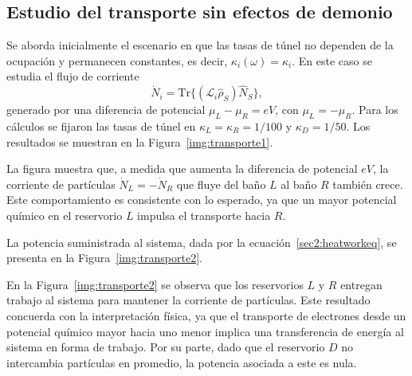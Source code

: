\subsection{Estudio del transporte sin efectos de demonio}

Se aborda inicialmente el escenario en que las tasas de túnel no dependen de la ocupación y permanecen constantes, es decir, $\kappa_{i}(\omega) = \kappa_{i}$. En este caso se estudia el flujo de corriente
\[
\dot{N}_{i} = \mathrm{Tr}\{(\mathcal{L}_{i}\hat{\rho}_{S})\hat{N}_{S}\},
\]
generado por una diferencia de potencial $\mu_{L} - \mu_{R} = eV$, con $\mu_{L}=-\mu_{R}$. Para los cálculos se fijaron las tasas de túnel en $\kappa_{L} = \kappa_{R} = 1/100$ y $\kappa_{D} = 1/50$. Los resultados se muestran en la Figura~\ref{img:transporte1}.  


La figura muestra que, a medida que aumenta la diferencia de potencial $eV$, la corriente de partículas $\dot{N}_L = -\dot{N}_R$ que fluye del baño $L$ al baño $R$ también crece. Este comportamiento es consistente con lo esperado, ya que un mayor potencial químico en el reservorio $L$ impulsa el transporte hacia $R$.  

La potencia suministrada al sistema, dada por la ecuación~\eqref{sec2:heatworkeq}, se presenta en la Figura~\ref{img:transporte2}.  

    
En la Figura~\ref{img:transporte2} se observa que los reservorios $L$ y $R$ entregan trabajo al sistema para mantener la corriente de partículas. Este resultado concuerda con la interpretación física, ya que el transporte de electrones desde un potencial químico mayor hacia uno menor implica una transferencia de energía al sistema en forma de trabajo. Por su parte, dado que el reservorio $D$ no intercambia partículas en promedio, la potencia asociada a este es nula.  

